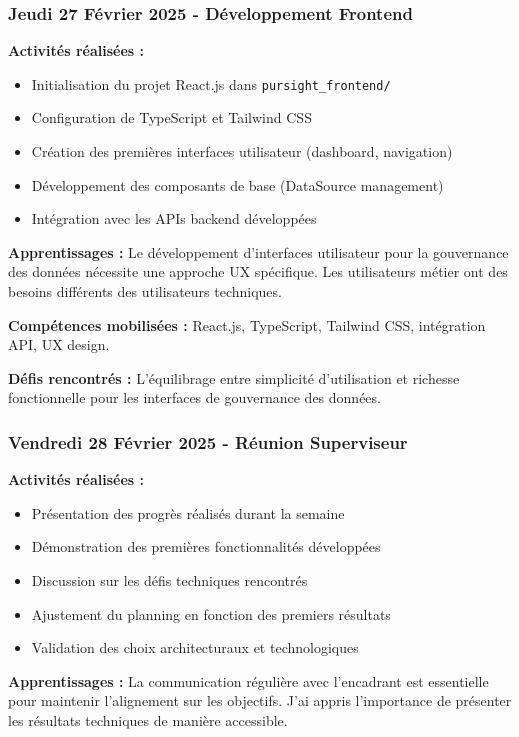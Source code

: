 \subsubsection{Jeudi 27 Février 2025 - Développement Frontend}

\textbf{Activités réalisées :}
\begin{itemize}
    \item Initialisation du projet React.js dans \texttt{pursight\_frontend/}
    \item Configuration de TypeScript et Tailwind CSS
    \item Création des premières interfaces utilisateur (dashboard, navigation)
    \item Développement des composants de base (DataSource management)
    \item Intégration avec les APIs backend développées
\end{itemize}

\textbf{Apprentissages :}
Le développement d'interfaces utilisateur pour la gouvernance des données nécessite une approche UX spécifique. Les utilisateurs métier ont des besoins différents des utilisateurs techniques.

\textbf{Compétences mobilisées :}
React.js, TypeScript, Tailwind CSS, intégration API, UX design.

\textbf{Défis rencontrés :}
L'équilibrage entre simplicité d'utilisation et richesse fonctionnelle pour les interfaces de gouvernance des données.

\subsubsection{Vendredi 28 Février 2025 - Réunion Superviseur}

\textbf{Activités réalisées :}
\begin{itemize}
    \item Présentation des progrès réalisés durant la semaine
    \item Démonstration des premières fonctionnalités développées
    \item Discussion sur les défis techniques rencontrés
    \item Ajustement du planning en fonction des premiers résultats
    \item Validation des choix architecturaux et technologiques
\end{itemize}

\textbf{Apprentissages :}
La communication régulière avec l'encadrant est essentielle pour maintenir l'alignement sur les objectifs. J'ai appris l'importance de présenter les résultats techniques de manière accessible.


